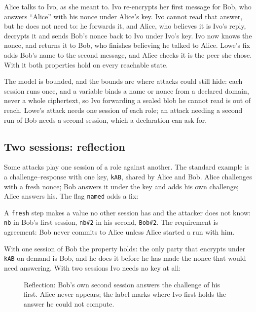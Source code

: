 Alice talks to Ivo, as she meant to. Ivo re-encrypts her first message for Bob,
who answers ``Alice'' with his nonce under Alice's key. Ivo cannot read that
answer, but he does not need to: he forwards it, and Alice, who believes it is
Ivo's reply, decrypts it and sends Bob's nonce back to Ivo under Ivo's key. Ivo
now knows the nonce, and returns it to Bob, who finishes believing he talked to
Alice. Lowe's fix adds Bob's name to the second message, and Alice checks it is
the peer she chose. With it both properties hold on every reachable state.

The model is bounded, and the bounds are where attacks could still hide: each
session runs once, and a variable binds a name or nonce from a declared domain,
never a whole ciphertext, so Ivo forwarding a sealed blob he cannot read is out
of reach. Lowe's attack needs one session of each role; an attack needing a
second run of Bob needs a second session, which a declaration can ask for.

\subsection{Two sessions: reflection}
\label{sec:reflection}

Some attacks play one session of a role against another. The standard example is
a challenge--response with one key, \texttt{kAB}, shared by Alice and Bob. Alice
challenges with a fresh nonce; Bob answers it under the key and adds his own
challenge; Alice answers his. The flag \texttt{named} adds a fix:



A \texttt{fresh} step makes a value no other session has and the attacker does not
know: \texttt{nb} in Bob's first session, \texttt{nb\#2} in his second,
\texttt{Bob\#2}. The requirement is agreement: Bob never commits to Alice unless
Alice started a run with him.

\begin{center}

\end{center}

With one session of Bob the property holds: the only party that encrypts under
\texttt{kAB} on demand is Bob, and he does it before he has made the nonce that
would need answering. With two sessions Ivo needs no key at all:



\begin{figure}[htbp]
\centering
\resizebox{\textwidth}{!}{}
\caption{Reflection: Bob's own second session answers the challenge of his first. Alice never
appears; the label marks where Ivo first holds the answer he could not compute.}
\label{fig:reflection-attack}
\end{figure}

